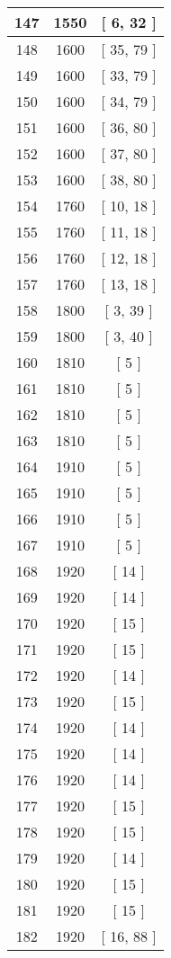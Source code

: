 \begin{center}
\begin{longtable}[H]{|| c c c ||}
\hline
147 & 1550 & [ 6, 32 ] \\ 
\hline
148 & 1600 & [ 35, 79 ] \\ 
\hline
149 & 1600 & [ 33, 79 ] \\ 
\hline
150 & 1600 & [ 34, 79 ] \\ 
\hline
151 & 1600 & [ 36, 80 ] \\ 
\hline
152 & 1600 & [ 37, 80 ] \\ 
\hline
153 & 1600 & [ 38, 80 ] \\ 
\hline
154 & 1760 & [ 10, 18 ] \\ 
\hline
155 & 1760 & [ 11, 18 ] \\ 
\hline
156 & 1760 & [ 12, 18 ] \\ 
\hline
157 & 1760 & [ 13, 18 ] \\ 
\hline
158 & 1800 & [ 3, 39 ] \\ 
\hline
159 & 1800 & [ 3, 40 ] \\ 
\hline
160 & 1810 & [ 5 ] \\ 
\hline
161 & 1810 & [ 5 ] \\ 
\hline
162 & 1810 & [ 5 ] \\ 
\hline
163 & 1810 & [ 5 ] \\ 
\hline
164 & 1910 & [ 5 ] \\ 
\hline
165 & 1910 & [ 5 ] \\ 
\hline
166 & 1910 & [ 5 ] \\ 
\hline
167 & 1910 & [ 5 ] \\ 
\hline
168 & 1920 & [ 14 ] \\ 
\hline
169 & 1920 & [ 14 ] \\ 
\hline
170 & 1920 & [ 15 ] \\ 
\hline
171 & 1920 & [ 15 ] \\ 
\hline
172 & 1920 & [ 14 ] \\ 
\hline
173 & 1920 & [ 15 ] \\ 
\hline
174 & 1920 & [ 14 ] \\ 
\hline
175 & 1920 & [ 14 ] \\ 
\hline
176 & 1920 & [ 14 ] \\ 
\hline
177 & 1920 & [ 15 ] \\ 
\hline
178 & 1920 & [ 15 ] \\ 
\hline
179 & 1920 & [ 14 ] \\ 
\hline
180 & 1920 & [ 15 ] \\ 
\hline
181 & 1920 & [ 15 ] \\ 
\hline
182 & 1920 & [ 16, 88 ] \\ 

\end{longtable}
\end{center}
